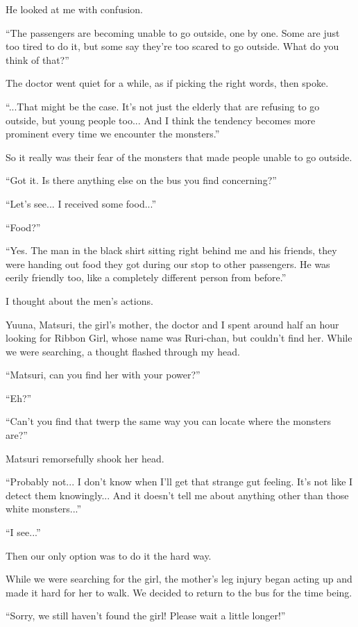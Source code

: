 He looked at me with confusion.

``The passengers are becoming unable to go outside, one by one. Some are just too tired to do it, but some say they're too scared to go outside. What do you think of that?''

The doctor went quiet for a while, as if picking the right words, then spoke.

``...That might be the case. It's not just the elderly that are refusing to go outside, but young people too... And I think the tendency becomes more prominent every time we encounter the monsters.''

So it really was their fear of the monsters that made people unable to go outside.

``Got it. Is there anything else on the bus you find concerning?''

``Let's see... I received some food...''

``Food?''

``Yes. The man in the black shirt sitting right behind me and his friends, they were handing out food they got during our stop to other passengers. He was eerily friendly too, like a completely different person from before.''

I thought about the men's actions.

Yuuna, Matsuri, the girl's mother, the doctor and I spent around half an hour looking for Ribbon Girl, whose name was Ruri-chan, but couldn't find her. While we were searching, a thought flashed through my head.

``Matsuri, can you find her with your power?''

``Eh?''

``Can't you find that twerp the same way you can locate where the monsters are?''

Matsuri remorsefully shook her head.

``Probably not... I don't know when I'll get that strange gut feeling. It's not like I detect them knowingly... And it doesn't tell me about anything other than those white monsters...''

``I see...''

Then our only option was to do it the hard way.

While we were searching for the girl, the mother's leg injury began acting up and made it hard for her to walk. We decided to return to the bus for the time being.

``Sorry, we still haven't found the girl! Please wait a little longer!''

